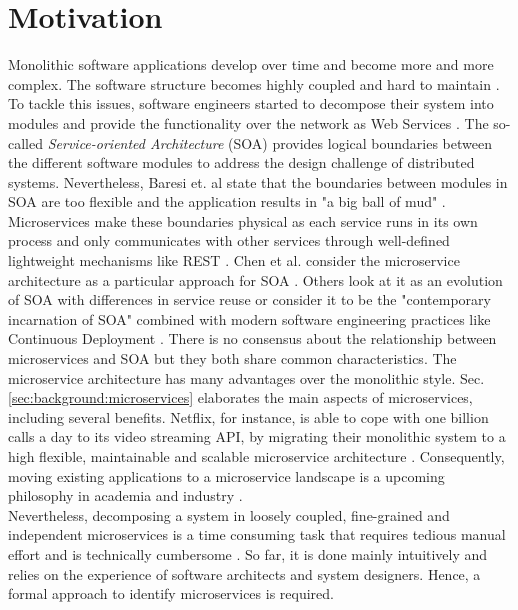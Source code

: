 \section{Motivation}
\label{sec:Introduction:Motivation}
Monolithic software applications develop over time and become more and more complex. The software structure becomes highly coupled and hard to maintain \cite{MigratingTowardsSurvey}. To tackle this issues, software engineers started to decompose their system into modules and provide the functionality over the network as Web Services \cite{ServiceCutter}. The so-called \textit{Service-oriented Architecture} (SOA) provides logical boundaries between the different software modules to address the design challenge of distributed systems. Nevertheless, Baresi et. al state that the boundaries between modules in SOA are too flexible and the application results in "a big ball of mud" \cite{interfaceAnalysisBaresi}. Microservices make these boundaries physical as each service runs in its own process and only communicates with other services through well-defined lightweight mechanisms like REST \cite{FunctionalDecompositionHeinrich}. Chen et al. consider the microservice architecture as a particular approach for SOA \cite{DataflowDrivenChen}. Others look at it as an evolution of SOA with differences in service reuse \cite{interfaceAnalysisBaresi} or consider it to be the "contemporary incarnation of SOA" combined with modern software engineering practices like Continuous Deployment \cite{ServiceCutter}. There is no consensus about the relationship between microservices and SOA but they both share common characteristics.
The microservice architecture has many advantages over the monolithic style. Sec.\ref{sec:background:microservices} elaborates the main aspects of microservices, including several benefits. Netflix, for instance, is able to cope with one billion calls a day to its video streaming API, by migrating their monolithic system to a high flexible, maintainable and scalable microservice architecture \cite{DataflowDrivenChen}. Consequently, moving existing applications to a microservice landscape is a upcoming philosophy in academia and industry \cite{ObjectAwareAmiri}. \\
Nevertheless, decomposing a system in loosely coupled, fine-grained and independent microservices is a time consuming task that requires tedious manual effort \cite{ServiceCutter} and is technically cumbersome \cite{HeuristicsAlwis}. So far, it is done mainly intuitively and relies on the experience of software architects and system designers. Hence, a formal approach to identify microservices is required. 



